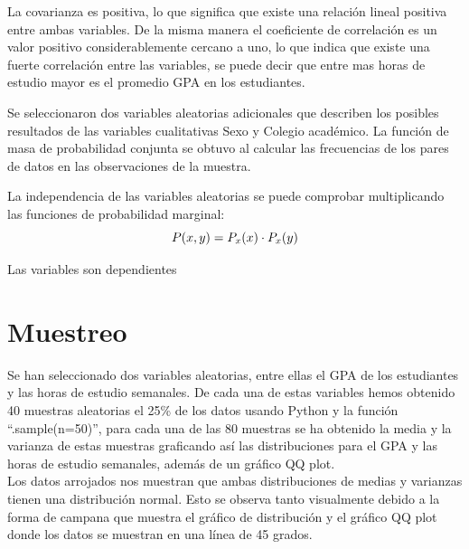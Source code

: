 \documentclass[12pt]{article}
\begin{document}
La covarianza es positiva, lo que significa que existe una relación lineal positiva entre ambas variables. De la misma manera el coeficiente de correlación es un valor positivo considerablemente cercano a uno, lo que indica que existe una fuerte correlación entre las variables, se puede decir que entre mas horas de estudio mayor es el promedio GPA en los estudiantes.

Se seleccionaron dos variables aleatorias adicionales que describen los posibles resultados de las variables cualitativas Sexo y Colegio académico. La función de masa de probabilidad conjunta se obtuvo al calcular las frecuencias de los pares de datos en las observaciones de la muestra. 
\clearpage

La independencia de las variables aleatorias se puede comprobar multiplicando las funciones de probabilidad marginal:\\

\begin{equation}
   P(x,y)= P_{x}(x)\cdot P_{x}(y)\\
\end{equation}

Las variables son dependientes

\section{Muestreo}

Se han seleccionado dos variables aleatorias, entre ellas el GPA de los estudiantes y las horas de estudio semanales. De cada una de estas variables hemos obtenido 40 muestras aleatorias el 25\% de los datos usando Python y la función “.sample(n=50)”, para cada una de las 80 muestras se ha obtenido la media y la varianza de estas muestras graficando así las distribuciones para el GPA y las horas de estudio semanales, además de un gráfico QQ plot.\\

Los datos arrojados nos muestran que ambas distribuciones de medias y varianzas tienen una distribución normal. Esto se observa tanto visualmente debido a la forma de campana que muestra el gráfico de distribución y el gráfico QQ plot donde los datos se muestran en una línea de 45 grados.\\
\end{document}
